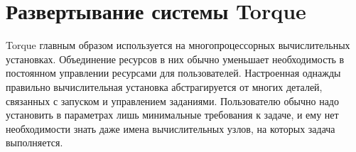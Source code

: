\section{Развертывание системы Torque}
Torque главным образом используется на многопроцессорных вычислительных установках. Объединение ресурсов в них обычно уменьшает необходимость в постоянном управлении ресурсами для пользователей. Настроенная однажды правильно вычислительная установка абстрагируется от многих деталей, связанных с запуском и управлением заданиями. Пользователю обычно надо установить в параметрах лишь минимальные требования к задаче, и ему нет необходимости знать даже имена вычислительных узлов, на которых задача выполняется.
